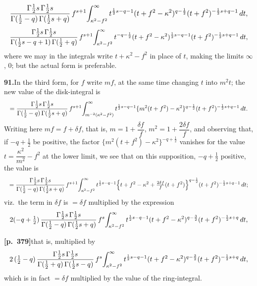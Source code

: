 \documentclass[11pt]{article}
\begin{document}
\[
\resizebox{\textwidth}{!}{$\displaystyle
\frac{\Gamma\tfrac{1}{2}s\,\Gamma\tfrac{1}{2}s}{\Gamma(\tfrac{1}{2}-q)\,\Gamma(\tfrac{1}{2}s+q)}\,f^{s+1}\!\int_{\kappa^{2}-f^{2}}^{\infty} t^{\frac{1}{2}s-q-1}(t+f^{2}-\kappa^{2})^{q-\frac{1}{2}}(t+f^{2})^{-\frac{1}{2}s+q-1}\,dt,$}
\]
\[
\resizebox{\textwidth}{!}{$\displaystyle
\frac{\Gamma\tfrac{1}{2}s\,\Gamma\tfrac{1}{2}s}{\Gamma(\tfrac{1}{2}s-q+1)\,\Gamma(\tfrac{1}{2}+q)}\,f^{s+1}\!\int_{\kappa^{2}-f^{2}}^{\infty} t^{-q-\frac{1}{2}}(t+f^{2}-\kappa^{2})^{\frac{1}{2}s-q-1}(t+f^{2})^{-\frac{1}{2}s+q-1}\,dt,$}
\]
where we may in the integrals write $t+\kappa^{2}-f^{2}$ in place of $t$, making the limits $\infty$, $0$; but the actual form is preferable.

\bigskip

\noindent\textbf{91.}\quad In the third form, for $f$ write $mf$, at the same time changing $t$ into $m^{2}t$; the new value of the disk-integral is
\[
\resizebox{\textwidth}{!}{$\displaystyle
= \frac{\Gamma\tfrac{1}{2}s\,\Gamma\tfrac{1}{2}s}{\Gamma(\tfrac{1}{2}-q)\,\Gamma(\tfrac{1}{2}s+q)}\,f^{s+1}\!\int_{m^{-2}(\kappa^{2}-f^{2})}^{\infty} t^{\frac{1}{2}s-q-1}\{m^{2}(t+f^{2})-\kappa^{2}\}^{q-\frac{1}{2}}(t+f^{2})^{-\frac{1}{2}s+q-1}\,dt.$}
\]
Writing here $mf=f+\delta f$, that is, $m=1+\dfrac{\delta f}{f}$, $m^{2}=1+\dfrac{2\delta f}{f}$, and observing that, if $-q+\tfrac{1}{2}$ be positive, the factor $\{m^{2}(t+f^{2})-\kappa^{2}\}^{-q+\frac{1}{2}}$ vanishes for the value $t=\dfrac{\kappa^{2}}{m^{2}}-f^{2}$ at the lower limit, we see that on this supposition, $-q+\tfrac{1}{2}$ positive, the value is
\[
\resizebox{\textwidth}{!}{$\displaystyle
= \frac{\Gamma\tfrac{1}{2}s\,\Gamma\tfrac{1}{2}s}{\Gamma(\tfrac{1}{2}-q)\,\Gamma(\tfrac{1}{2}s+q)}\,f^{s+1}\!\int_{\kappa^{2}-f^{2}}^{\infty} t^{\frac{1}{2}s-q-1}\!\left\{t+f^{2}-\kappa^{2} + \tfrac{2\delta f}{f}(t+f^{2})\right\}^{q-\frac{1}{2}}\!(t+f^{2})^{-\frac{1}{2}s+q-1}\,dt;$}
\]
viz.\ the term in $\delta f$ is $=\delta f$ multiplied by the expression
\[
\resizebox{\textwidth}{!}{$\displaystyle
2(-q+\tfrac{1}{2})\,\frac{\Gamma\tfrac{1}{2}s\,\Gamma\tfrac{1}{2}s}{\Gamma(\tfrac{1}{2}-q)\,\Gamma(\tfrac{1}{2}s+q)}\,f^{s}\!\int_{\kappa^{2}-f^{2}}^{\infty} t^{\frac{1}{2}s-q-1}(t+f^{2}-\kappa^{2})^{q-\frac{3}{2}}(t+f^{2})^{-\frac{1}{2}s+q}\,dt,$}
\]

\bigskip

\noindent\textbf{[p.~379]}\quad that is, multiplied by
\[
\resizebox{\textwidth}{!}{$\displaystyle
2\,(\tfrac{1}{2}-q)\,\frac{\Gamma\tfrac{1}{2}s\,\Gamma\tfrac{1}{2}s}{\Gamma(\tfrac{1}{2}+q)\,\Gamma(\tfrac{1}{2}s-q)}\,f^{s}\!\int_{\kappa^{2}-f^{2}}^{\infty} t^{\frac{1}{2}s-q-1}(t+f^{2}-\kappa^{2})^{q-\frac{3}{2}}(t+f^{2})^{-\frac{1}{2}s+q}\,dt,$}
\]
which is in fact $=\delta f$ multiplied by the value of the ring-integral.
\end{document}
